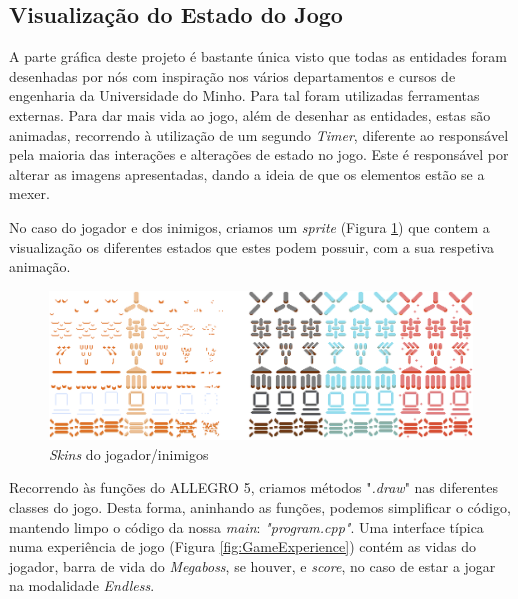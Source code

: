 \documentclass[a4paper,11pt]{article}
\newcommand\tab[1][0.8cm]{\hspace*{#1}}
\begin{document}
\vspace{8pt}

\subsection{Visualização do Estado do Jogo}
\tab A parte gráfica deste projeto é bastante única visto que todas as entidades foram desenhadas por nós com inspiração nos vários departamentos e cursos de engenharia da Universidade do Minho. Para tal foram utilizadas ferramentas externas. Para dar mais vida ao jogo, além de desenhar as entidades, estas são animadas, recorrendo à utilização de um segundo \textit{Timer}, diferente ao responsável pela maioria das interações e alterações de estado no jogo. Este é responsável por alterar as imagens apresentadas, dando a ideia de que os elementos estão se a mexer.

\vspace{8pt}

No caso do jogador e dos inimigos, criamos um \textit{sprite} (Figura \ref{fig:Skins}) que contem a visualização os diferentes estados que estes podem possuir, com a sua respetiva animação.

\vspace{8pt}

\begin{figure}[H]
    \centering
    \includegraphics[scale = 0.30]{1 - Imagens/skins.png}
    \caption{\textit{Skins} do jogador/inimigos}
    \label{fig:Skins}
\end{figure}

\vspace{8pt}

Recorrendo às funções do ALLEGRO 5, criamos métodos "\textit{.draw}" nas diferentes classes do jogo. Desta forma, aninhando as funções, podemos simplificar o código, mantendo limpo o código da nossa \textit{main}: \textit{"program.cpp"}. Uma interface típica numa experiência de jogo (Figura \ref{fig:GameExperience}) contém as vidas do jogador, barra de vida do \textit{Megaboss}, se houver, e \textit{score}, no caso de estar a jogar na modalidade \textit{Endless}.
\vspace{8pt}
\end{document}

